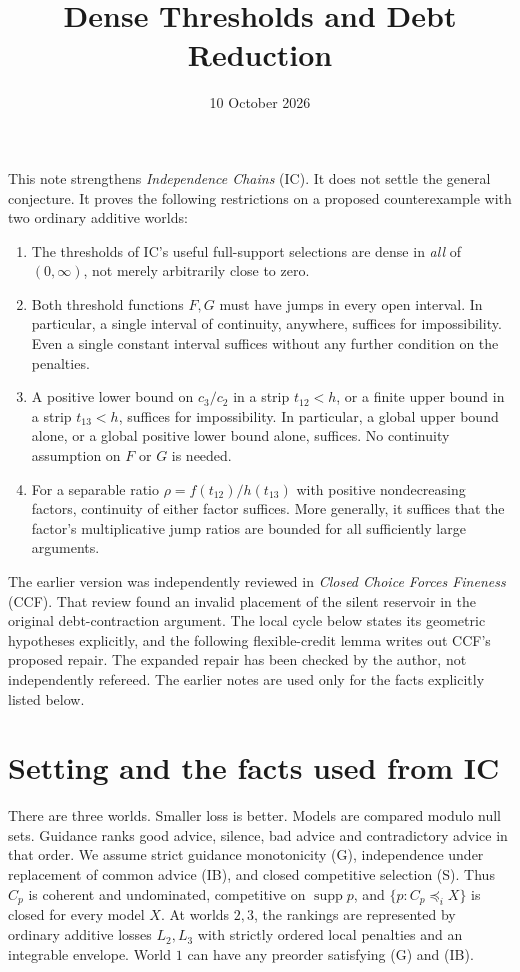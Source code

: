 \documentclass[11pt]{article}
\title{Dense Thresholds and Debt Reduction}
\author{}\date{10 October 2026}
\theoremstyle{remark}\newtheorem{remark}[theorem]{Remark}
\begin{document}
\maketitle

\noindent
This note strengthens \emph{Independence Chains} (IC). It does not settle
the general conjecture. It proves the following restrictions on a proposed
counterexample with two ordinary additive worlds:
\begin{enumerate}[leftmargin=*,itemsep=2pt]
\item The thresholds of IC's useful full-support selections are dense in
\emph{all} of $(0,\infty)$, not merely arbitrarily close to zero.
\item Both threshold functions $F,G$ must have jumps in every open interval.
In particular, a single interval of continuity, anywhere, suffices for
impossibility. Even a single constant interval suffices without any further
condition on the penalties.
\item A positive lower bound on $c_3/c_2$ in a strip $t_{12}<h$, or a finite
upper bound in a strip $t_{13}<h$, suffices for impossibility. In particular, a global upper
bound alone, or a global positive lower bound alone, suffices. No continuity
assumption on $F$ or $G$ is needed.
\item For a separable ratio $\rho=f(t_{12})/h(t_{13})$ with positive
nondecreasing factors, continuity of either factor suffices. More generally,
it suffices that the factor's multiplicative jump ratios are bounded
for all sufficiently large arguments.
\end{enumerate}
The earlier version was independently reviewed in \emph{Closed Choice
Forces Fineness} (CCF). That review found an invalid placement of the
silent reservoir in the original debt-contraction argument. The local
cycle below states its geometric hypotheses explicitly, and the following
flexible-credit lemma writes out CCF's proposed repair. The expanded repair
has been checked by the author, not independently refereed. The earlier
notes are used only for the facts explicitly listed below.

\section{Setting and the facts used from IC}

There are three worlds. Smaller loss is better. Models are compared modulo
null sets. Guidance ranks good advice, silence, bad advice and contradictory
advice in that order. We assume strict guidance monotonicity (G), independence
under replacement of common advice (IB), and closed competitive selection (S).
Thus $C_p$ is coherent and undominated, competitive on $\operatorname{supp}p$,
and $\{p:C_p\preceq_iX\}$ is closed for every model $X$.
At worlds $2,3$, the rankings are represented by ordinary additive losses
$L_2,L_3$ with strictly ordered local penalties and an integrable envelope.
World $1$ can have any preorder satisfying (G) and (IB).
\end{document}
